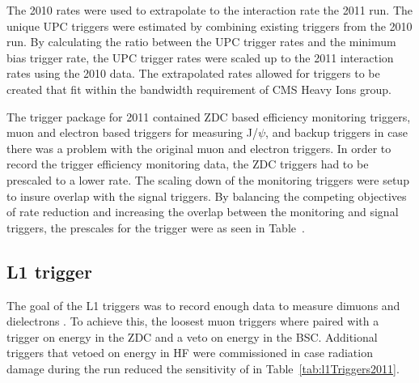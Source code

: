     The 2010 rates were used to extrapolate to the interaction rate \DIFdelbegin {}\DIFdelend \DIFaddbegin {}\DIFaddend the 2011 \DIFdelbegin {}\DIFdelend run. 
    The unique UPC triggers were estimated by combining existing triggers from
      the 2010 run. 
    By calculating the ratio between the UPC trigger rates and the minimum bias
      trigger rate, the UPC trigger rates were scaled up to the 2011 
      interaction rates using the 2010 data. 
    The extrapolated rates allowed for \DIFdelbegin {}\DIFdelend \DIFaddbegin {}\DIFaddend triggers to 
      be created that  fit within the bandwidth requirement of CMS Heavy Ions 
      group. 

    The trigger package for 2011 contained ZDC based efficiency monitoring 
      triggers, muon and electron based triggers for measuring J/$\psi$, and 
      backup triggers in case there was a problem with the original muon and 
      electron triggers.
    In order to record the trigger efficiency monitoring data, the ZDC 
      triggers had to be prescaled to a lower rate. 
    The scaling down of the monitoring triggers were setup to insure overlap
      with the signal triggers.
    By balancing the competing objectives of rate reduction and increasing 
      the overlap between the monitoring and signal triggers, 
      the prescales for the trigger were as seen in Table~\DIFdelbegin \DIFdel{\ref{triggerTabel2011}}\DIFdelend \DIFaddbegin \DIFadd{\ref{tab:l1Triggers2011}}\DIFaddend .

    \subsection{\label{sec:l1Trigger} L1 trigger}
      The goal of the \DIFaddbegin {}\DIFaddend L1 triggers was to record enough data to measure 
        \DIFaddbegin {}\JPsi {}\DIFaddend dimuons and dielectrons \DIFdelbegin {}\DIFdelend \DIFaddbegin {}\DIFaddend .
      To achieve this, the loosest muon \DIFdelbegin {}\DIFdelend \DIFaddbegin {}\DIFaddend triggers where paired with
        a trigger on energy in the ZDC and a veto on energy in the BSC.
      Additional triggers that vetoed on energy in HF were commissioned in case
        radiation damage during the run reduced the sensitivity of \DIFdelbegin {}\DIFdelend \DIFaddbegin {}\DIFaddend in Table~\ref{tab:l1Triggers2011}. 

